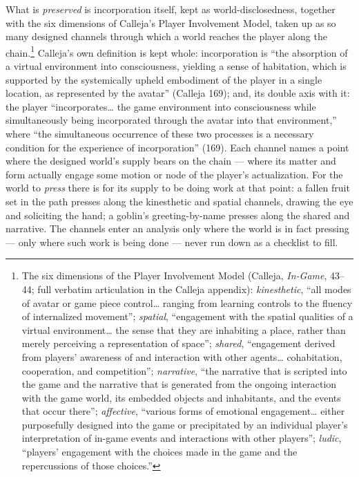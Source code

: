 \documentclass{article}
\begin{document}
What is \textit{preserved} is incorporation itself, kept as world-disclosedness, together with the six dimensions of Calleja's Player Involvement Model, taken up as so many designed channels through which a world reaches the player along the chain.\footnote{The six dimensions of the Player Involvement Model (Calleja, \textit{In-Game}, 43–44; full verbatim articulation in the Calleja appendix): \textit{kinesthetic}, ``all modes of avatar or game piece control… ranging from learning controls to the fluency of internalized movement''; \textit{spatial}, ``engagement with the spatial qualities of a virtual environment… the sense that they are inhabiting a place, rather than merely perceiving a representation of space''; \textit{shared}, ``engagement derived from players' awareness of and interaction with other agents… cohabitation, cooperation, and competition''; \textit{narrative}, ``the narrative that is scripted into the game and the narrative that is generated from the ongoing interaction with the game world, its embedded objects and inhabitants, and the events that occur there''; \textit{affective}, ``various forms of emotional engagement… either purposefully designed into the game or precipitated by an individual player's interpretation of in-game events and interactions with other players''; \textit{ludic}, ``players' engagement with the choices made in the game and the repercussions of those choices.''} Calleja's own definition is kept whole: incorporation is ``the absorption of a virtual environment into consciousness, yielding a sense of habitation, which is supported by the systemically upheld embodiment of the player in a single location, as represented by the avatar'' (Calleja 169); and, its double axis with it: the player ``incorporates… the game environment into consciousness while simultaneously being incorporated through the avatar into that environment,'' where ``the simultaneous occurrence of these two processes is a necessary condition for the experience of incorporation'' (169). Each channel names a point where the designed world's supply bears on the chain — where its matter and form actually engage some motion or node of the player's actualization. For the world to \textit{press} there is for its supply to be doing work at that point: a fallen fruit set in the path presses along the kinesthetic and spatial channels, drawing the eye and soliciting the hand; a goblin's greeting-by-name presses along the shared and narrative. The channels enter an analysis only where the world is in fact pressing — only where such work is being done — never run down as a checklist to fill.
\end{document}
